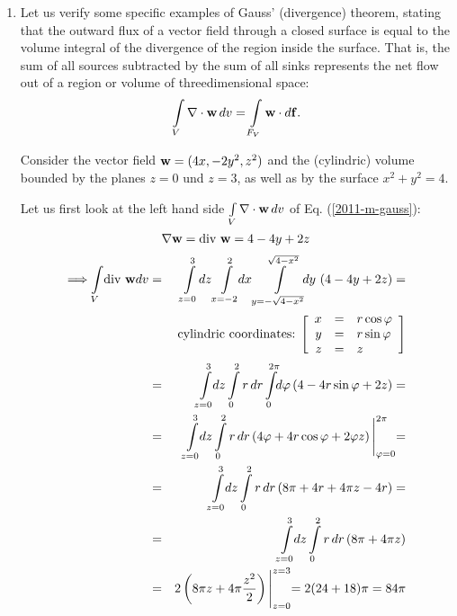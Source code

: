 {\begin{enumerate}
\item
Let us verify  some specific examples of Gauss' (divergence) theorem,
stating that the outward flux of a vector field through a closed surface
is equal to the volume integral of the divergence of the region inside the surface.
That is, the sum of all sources subtracted by the sum of all sinks represents the net flow out of a region or volume of threedimensional space:
\begin{equation}
\int \limits_V \nabla \cdot {\bf w} \, dv   =\int \limits_{F_V} {\bf w} \cdot d{\bf f}
.   \label{2011-m-gauss}
\end{equation}

Consider the vector field ${\bf w} = (4x, -2y^2, z^2)$
and the (cylindric) volume bounded by the planes  $z=0$ und $z=3$,
as well as by the surface
$x^2 + y^2 = 4$.


Let us first look at the left hand side $\int \limits_V \nabla \cdot {\bf w} \, dv $
of Eq. (\ref{2011-m-gauss}):
$$
  \nabla {\bf w}=\textrm{div } {\bf w}=4-4y+2z
$$
\begin{eqnarray*}
  \Longrightarrow \int \limits_V \! \textrm{div } {\bf w} dv& = &
  \int \limits_{z=0}^3 \! dz \int \limits_{x=-2}^2 \!\! dx
  \int \limits_{y=-\sqrt{4-x^2}}^{\sqrt{4-x^2}} \!\!\!dy\,
    \left(4-4y+2z\right)= \\
  & & \mbox{cylindric coordinates: }
  \Biggl[
    \begin{array}{rcl}
      x & = & r \cos \varphi \\
      y & = & r \sin \varphi \\
      z & = & z
    \end{array}
  \Biggr] \\
  & = & \int \limits_{z=0}^3 \!\! dz \int \limits_0^2 r\, dr
  \int \limits_0^{2\pi} \!\! d\varphi \left(4-4r \sin \varphi+2z\right)= \\
  & = & \int \limits_{z=0}^3 \!\! dz \int \limits_0^2 r \, dr
  \left(4 \varphi +4r\cos\varphi+2\varphi z\right)
  \Biggl|_{\varphi=0}^{2 \pi}= \\
  & = & \int \limits_{z=0}^3 \!\! dz \int \limits_0^2 r\, dr
  \left(8 \pi +4r+4 \pi z -4r\right)= \\
  & = & \int \limits_{z=0}^3 \!\! dz \int \limits_0^2 r\, dr
  \left(8 \pi +4 \pi z\right) \\
  & = & 2 \left( 8 \pi z +4 \pi \frac{z^2}{2}\right)\Biggl|_{z=0}^{z=3}=
    2 (24+18) \pi = 84 \pi
\end{eqnarray*}


\end{enumerate}}
